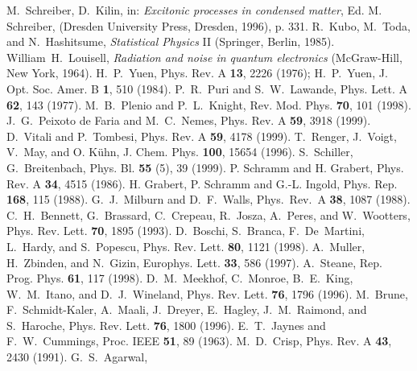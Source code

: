 \documentclass[12pt,twoside,a4paper]{report}
\begin{document}
{\begin{thebibliography}{999}
 M.~Schreiber, D.~Kilin,
  in: {\it Excitonic processes in condensed matter}, Ed. M.
  Schreiber, (Dresden University Press, Dresden, 1996), p. 331.
 R.~Kubo, M.~Toda, and N.~Hashitsume,  
                 {\it Statistical Physics} II (Springer, Berlin, 1985).
 William~H.~Louisell, 
                 {\it Radiation and noise in quantum electronics}
                 (McGraw-Hill, New York, 1964).
 H.~P.~Yuen, Phys. Rev. A {\bf 13}, 2226 (1976);
                 H.~P.~Yuen, J. Opt. Soc. Amer. B {\bf 1}, 510 (1984).
 P.~R.~Puri and S.~W.~Lawande, Phys. Lett. A {\bf 62}, 143 (1977).
 M.~B.~Plenio and P.~L.~Knight, Rev. Mod. Phys. {\bf 70}, 101 (1998).
 J.~G.~Peixoto de Faria and M.~C.~Nemes, Phys. Rev. A {\bf 59}, 3918 (1999).
 D.~Vitali and P.~Tombesi, Phys. Rev. A {\bf 59}, 4178 (1999).
 T.~Renger, J.~Voigt, V.~May, and O. K\"uhn, J. Chem. Phys. {\bf 100}, 15654 (1996).
  S.~Schiller, G.~Breitenbach, Phys. Bl. {\bf 55} (5), 39 (1999).
 P. Schramm and H. Grabert, Phys. Rev. A {\bf  34}, 4515 (1986).  
 H. Grabert, P. Schramm and G.-L.  Ingold, Phys. Rep. {\bf 168}, 115 (1988).  
 G.~J.~Milburn and D.~F.~Walls, Phys.~Rev.~A {\bf 38}, 1087 (1988).
 C.~H.~Bennett, G.~Brassard, C.~Crepeau, R.~Josza, A.~Peres,  and W.~Wootters, Phys. Rev. Lett. {\bf 70}, 1895 (1993).
 D.~Boschi, S.~Branca, F.~De~Martini, L.~Hardy, and S.~Popescu,  Phys. Rev. Lett. {\bf 80}, 1121 (1998).
 A.~Muller, H.~Zbinden, and N.~Gizin,   Europhys. Lett. {\bf 33}, 586 (1997).
 A.~Steane, Rep. Prog. Phys. {\bf 61}, 117 (1998). 
 D.~M.~Meekhof, C.~Monroe, B.~E.~King, W.~M.~Itano, and D.~J.~Wineland, Phys. Rev. Lett. {\bf 76}, 1796 (1996).
 M.~Brune, F.~Schmidt-Kaler, A.~Maali, J.~Dreyer, E.~Hagley, J.~M.~Raimond, and S.~Haroche, Phys. Rev. Lett. {\bf 76}, 1800 (1996).  
 E.~T.~Jaynes and F.~W.~Cummings,  Proc. IEEE {\bf 51}, 89 (1963).  
 M.~D.~Crisp, Phys.  Rev. A {\bf 43}, 2430 (1991).  
 G.~S.~Agarwal, 

\end{thebibliography}}
\end{document}
